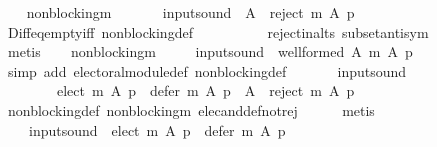 \begin{isabellebody}
\ \ \isamarkupfalse%
\ non{\isacharunderscore}{\kern0pt}blocking{\isacharunderscore}{\kern0pt}m\ \isamarkupfalse%
\ {}{\isacharcolon}{\kern0pt}\isanewline
\ \ \ \ {\isachardoublequoteopen}{\isacharquery}{\kern0pt}input{\isacharunderscore}{\kern0pt}sound\ {\isasymlongrightarrow}\ A\ {\isacharminus}{\kern0pt}\ reject\ m\ A\ p\ {\isasymnoteq}\ {\isacharbraceleft}{\kern0pt}{\isacharbraceright}{\kern0pt}{\isachardoublequoteclose}\isanewline
\ \ \ \ \isamarkupfalse%
\ Diff{\isacharunderscore}{\kern0pt}eq{\isacharunderscore}{\kern0pt}empty{\isacharunderscore}{\kern0pt}iff\ non{\isacharunderscore}{\kern0pt}blocking{\isacharunderscore}{\kern0pt}def\isanewline
\ \ \ \ \ \ \ \ \ \ reject{\isacharunderscore}{\kern0pt}in{\isacharunderscore}{\kern0pt}alts\ subset{\isacharunderscore}{\kern0pt}antisym\isanewline
\ \ \ \ \isamarkupfalse%
\ metis\isanewline
\ \ \isamarkupfalse%
\ non{\isacharunderscore}{\kern0pt}blocking{\isacharunderscore}{\kern0pt}m\ \isamarkupfalse%
\isanewline
\ \ \ \ {\isachardoublequoteopen}{\isacharquery}{\kern0pt}input{\isacharunderscore}{\kern0pt}sound\ {\isasymlongrightarrow}\ well{\isacharunderscore}{\kern0pt}formed\ A\ {\isacharparenleft}{\kern0pt}m\ A\ p{\isacharparenright}{\kern0pt}{\isachardoublequoteclose}\isanewline
\ \ \ \ \isamarkupfalse%
\ {\isacharparenleft}{\kern0pt}simp\ add{\isacharcolon}{\kern0pt}\ electoral{\isacharunderscore}{\kern0pt}module{\isacharunderscore}{\kern0pt}def\ non{\isacharunderscore}{\kern0pt}blocking{\isacharunderscore}{\kern0pt}def{\isacharparenright}{\kern0pt}\isanewline
\ \ \isamarkupfalse%
\isanewline
\ \ \ \ {\isachardoublequoteopen}{\isacharquery}{\kern0pt}input{\isacharunderscore}{\kern0pt}sound\ {\isasymlongrightarrow}\isanewline
\ \ \ \ \ \ \ \ elect\ m\ A\ p\ {\isasymunion}\ defer\ m\ A\ p\ {\isacharequal}{\kern0pt}\ A\ {\isacharminus}{\kern0pt}\ reject\ m\ A\ p{\isachardoublequoteclose}\isanewline
\ \ \ \ \isamarkupfalse%
\ non{\isacharunderscore}{\kern0pt}blocking{\isacharunderscore}{\kern0pt}def\ non{\isacharunderscore}{\kern0pt}blocking{\isacharunderscore}{\kern0pt}m\ elec{\isacharunderscore}{\kern0pt}and{\isacharunderscore}{\kern0pt}def{\isacharunderscore}{\kern0pt}not{\isacharunderscore}{\kern0pt}rej\isanewline
\ \ \ \ \isamarkupfalse%
\ metis\isanewline
\ \ \isamarkupfalse%
\ {}\ \isamarkupfalse%
\isanewline
\ \ \ \ {\isachardoublequoteopen}{\isacharquery}{\kern0pt}input{\isacharunderscore}{\kern0pt}sound\ {\isasymlongrightarrow}\ elect\ m\ A\ p\ {\isasymunion}\ defer\ m\ A\ p\ {\isasymnoteq}\ {\isacharbraceleft}{\kern0pt}{\isacharbraceright}{\kern0pt}{\isachardoublequoteclose}\isanewline

\end{isabellebody}
